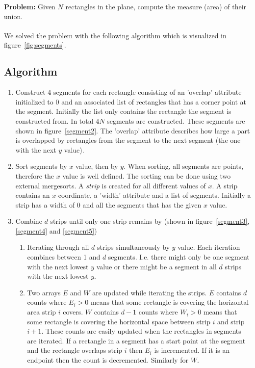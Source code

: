 \textbf{Problem:} Given $N$ rectangles in the plane, compute the measure (area) of their union.
\\
\\We solved the problem with the following algorithm which is visualized in figure~\ref{fig:segments}.

\subsection{Algorithm}

\begin{enumerate}
\item \label{enu:segments} Construct 4 segments for each rectangle consisting of an 'overlap' attribute initialized to 0 and an associated list of rectangles that has a corner point at the segment. Initially the list only contains the rectangle the segment is constructed from. In total $4N$ segments are constructed. These segments are shown in figure~\ref{segment2}. The 'overlap' attribute describes how large a part is overlapped by rectangles from the segment to the next segment (the one with the next $y$ value).
\item \label{enu:sorting} Sort segments by $x$ value, then by $y$. When sorting, all segments are points, therefore the $x$ value is well defined. The sorting can be done using two external mergesorts. A \emph{strip} is created for all different values of $x$. A strip contains an $x$-coordinate, a 'width' attribute and a list of segments. Initially a strip has a width of 0 and all the segments that has the given $x$ value.
\item \label{enum:combine} Combine $d$ strips until only one strip remains by (shown in figure~\ref{segment3}, \ref{segment4} and \ref{segment5})
    \begin{enumerate}
        \item Iterating through all $d$ strips simultaneously by $y$ value. Each iteration combines between 1 and $d$ segments. I.e. there might only be one segment with the next lowest $y$ value or there might be a segment in all $d$ strips with the next lowest $y$.
        \item Two arrays $E$ and $W$ are updated while iterating the strips. $E$ contains $d$ counts where $E_i>0$ means that some rectangle is covering the horizontal area strip $i$ covers. $W$ contains $d-1$ counts where $W_i>0$ means that some rectangle is covering the horizontal space between strip $i$ and strip $i+1$. These counts are easily updated when the rectangles in segments are iterated. If a rectangle in a segment has a start point at the segment and the rectangle overlaps strip $i$  then $E_i$ is incremented. If it is an endpoint then the count is decremented. Similarly for $W$.

\end{enumerate}
\end{enumerate}
